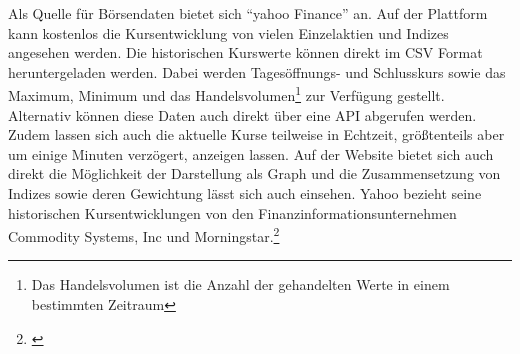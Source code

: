
Als Quelle für Börsendaten bietet sich \enquote{yahoo Finance} an. Auf der Plattform kann kostenlos die Kursentwicklung von vielen Einzelaktien und Indizes angesehen werden. Die historischen Kurswerte können direkt im \gls{CSV} Format heruntergeladen werden. Dabei werden Tagesöffnungs- und Schlusskurs sowie das Maximum, Minimum und das Handelsvolumen\footnote{Das Handelsvolumen ist die Anzahl der gehandelten Werte in einem bestimmten Zeitraum} zur Verfügung gestellt. Alternativ können diese Daten auch direkt über eine \gls{API} abgerufen werden. Zudem lassen sich auch die aktuelle Kurse teilweise in Echtzeit, größtenteils aber um einige Minuten verzögert, anzeigen lassen. Auf der Website bietet sich auch direkt die Möglichkeit der Darstellung als Graph und die Zusammensetzung von Indizes sowie deren Gewichtung lässt sich auch einsehen. Yahoo bezieht seine historischen Kursentwicklungen von den Finanzinformationsunternehmen Commodity Systems, Inc und Morningstar.\footnote{\cite[Vgl.][]{YahooFinanceSources}}


\clearpage